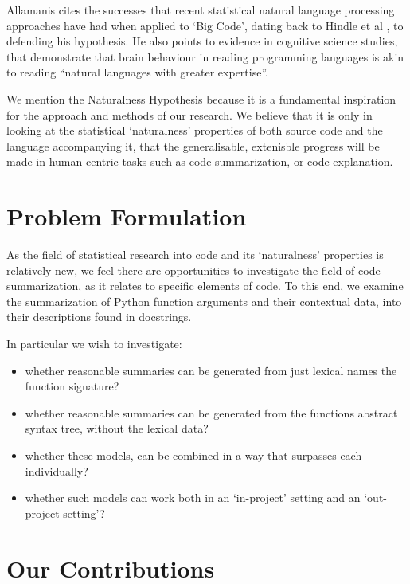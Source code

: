 Allamanis cites the successes that recent statistical natural language processing approaches have had when applied to `Big Code', dating back to Hindle et al \cite{hindle_naturalness_nodate}, to defending his hypothesis. He also points to evidence in cognitive science studies, that demonstrate that brain behaviour in reading programming languages is akin to reading ``natural languages with greater expertise''\cite{floyd_decoding_2017}.

We mention the Naturalness Hypothesis because it is a fundamental inspiration for the approach and methods of our research.
We believe that it is only in looking at the statistical `naturalness' properties of both source code and the language accompanying it, that the generalisable, extenisble progress will be made in human-centric tasks such as code summarization, or code explanation.


\section{Problem Formulation} %
\label{sec:problem_formulation}

As the field of statistical research into code and its `naturalness' properties is relatively new, we feel there are opportunities to investigate the field of code summarization, as it relates to specific elements of code. 
To this end, we examine the summarization of Python function arguments and their contextual data, into their descriptions found in docstrings.

In particular we wish to investigate:
\begin{itemize}
    \item whether reasonable summaries can be generated from just lexical names the function signature?
    \item whether reasonable summaries can be generated from the functions abstract syntax tree, without the lexical data?
    \item whether these models, can be combined in a way that surpasses each individually?
    \item whether such models can work both in an `in-project' setting and an `out-project setting'?
\end{itemize}
 
\section{Our Contributions}

